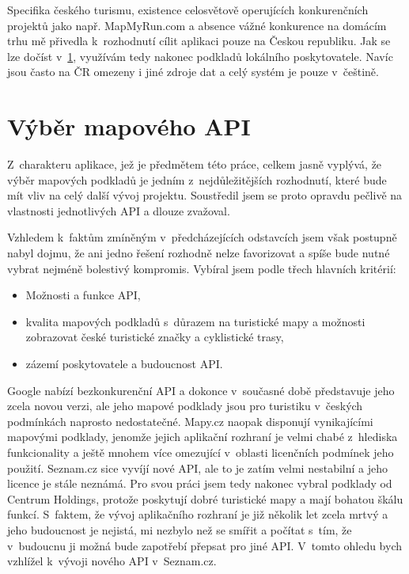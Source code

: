 Specifika českého turismu, existence celosvětově operujících
konkurenčních projektů jako např. MapMyRun.com a absence vážné
konkurence na domácím trhu mě přivedla k~rozhodnutí cílit aplikaci
pouze na Českou republiku. Jak se lze dočíst v~\ref{vybranamapa},
využívám tedy nakonec podkladů lokálního poskytovatele. Navíc jsou
často na ČR omezeny i jiné zdroje dat a celý systém je pouze
v~češtině.

\section{Výběr mapového API}\label{vybranamapa}
Z~charakteru aplikace, jež je předmětem této práce, celkem jasně
vyplývá, že výběr mapových podkladů je jedním z~nej\-důležitějších
rozhodnutí, které bude mít vliv na celý další vývoj projektu.
Soustředil jsem se proto opravdu pečlivě na vlastnosti
jednotlivých API a dlouze zvažoval.

Vzhledem k~faktům zmíněným v~předcházejících odstavcích jsem však
postupně nabyl dojmu, že ani jedno řešení rozhodně nelze favorizovat a
spíše bude nutné vybrat nej\-méně bolestivý kompromis. Vybíral jsem
podle třech hlavních kritérií:
\begin{itemize}
	\item Možnosti a funkce API,
	\item kvalita mapových podkladů s~důrazem na turistické
	mapy a možnosti zobrazovat české turistické značky a cyklistické
	trasy,
	\item zázemí poskytovatele a budoucnost API.
\end{itemize}

Google nabízí bezkonkurenční API a dokonce v~současné době
představuje jeho zcela novou verzi, ale jeho mapové podklady jsou pro turistiku
v~českých podmínkách naprosto nedostatečné. Mapy.cz naopak disponují
vynikajícími mapovými podklady, jenomže jejich aplikační rozhraní je
velmi chabé z~hlediska funkcionality a ještě mnohem více omezující
v~oblasti licenčních podmínek jeho použití. Seznam.cz sice vyvíjí nové
API, ale to je zatím velmi nestabilní a jeho licence je stále
neznámá. Pro svou práci jsem tedy nakonec vybral podklady od Centrum
Holdings, protože poskytují dobré turistické mapy a mají bohatou
škálu funkcí. S~faktem, že vývoj aplikačního rozhraní je již několik
let zcela mrtvý a jeho budoucnost je nejistá, mi nezbylo než se
smířit a počítat s~tím, že v~budoucnu ji možná bude zapotřebí přepsat
pro jiné API. V~tomto ohledu bych vzhlížel k~vývoji nového API v~Seznam.cz.

